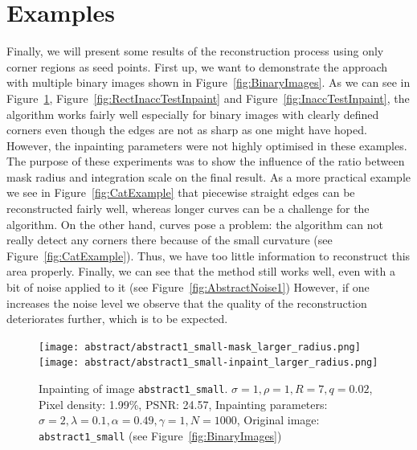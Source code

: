 \section{Examples}\label{sec:Results}
Finally, we will present some results of the reconstruction process using only corner regions as
seed points.
First up, we want to demonstrate the approach with multiple binary images shown in
Figure~\ref{fig:BinaryImages}. As we can see in Figure~\ref{fig:AbstractInpainting}, Figure~\ref{fig:RectInaccTestInpaint} and Figure~\ref{fig:InaccTestInpaint}, the algorithm works fairly well especially for binary
images with clearly defined corners even though the edges are not as sharp as one might have
hoped. However, the inpainting parameters were not highly optimised in these examples. The purpose
of these experiments was to show the influence of the ratio between mask radius and integration
scale on the final result. As a more practical example we see in Figure~\ref{fig:CatExample} that
piecewise straight edges can be reconstructed fairly well, whereas longer curves can be a challenge
for the algorithm.  On the other hand, curves pose a problem: the algorithm can
not really detect any corners there because of the small curvature (see Figure~\ref{fig:CatExample}). 
Thus, we have too little information to reconstruct this area properly. 
Finally, we can see that the method still works well, even with a bit of 
noise applied to it (see Figure~\ref{fig:AbstractNoise1})
However, if one increases the noise level we observe that the quality of the reconstruction
deteriorates further, which is to be expected.
\begin{figure}[ht]
    \centering
    \vspace*{0.2cm}
    \texttt{[image: abstract/abstract1\_small-mask\_larger\_radius.png]}\hspace{0.2cm}
    \texttt{[image: abstract/abstract1\_small-inpaint\_larger\_radius.png]}
    \caption{Inpainting of image \texttt{abstract1\_small}. $\sigma=1,\rho=1,R=7,q=0.02$, Pixel
        density: 1.99\%, PSNR\@: 24.57, Inpainting parameters:
        $\sigma=2,\lambda=0.1,\alpha=0.49,\gamma=1,N=1000$, Original image:
        \texttt{abstract1\_small} (see Figure~\ref{fig:BinaryImages})}\label{fig:AbstractInpainting}
\end{figure}
